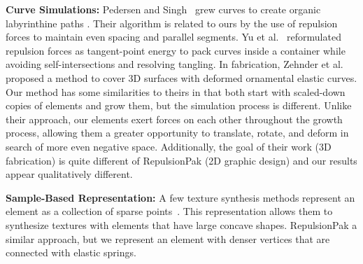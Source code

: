 \newtext
{
\textbf{Curve Simulations:}
Pedersen and Singh~\cite{Pedersen2006} grew curves to create organic
labyrinthine paths . 
Their algorithm is related to ours by the use
of repulsion forces to maintain even spacing and parallel segments.
Yu et al.~\cite{Yu2020} reformulated repulsion forces as tangent-point energy
to pack curves inside a container while avoiding self-intersections and resolving tangling.
In fabrication, Zehnder et al.~\cite{Zehnder2016} proposed a method to
cover 3D surfaces with deformed ornamental elastic curves.
Our method has some similarities to theirs in that both start with 
scaled-down copies of elements and grow them, but the simulation process is different.  
Unlike their approach, our elements exert
forces on each other throughout the growth process, allowing them a greater
opportunity to translate, rotate, and deform in search of more even negative space.  
Additionally, the goal of their work (3D fabrication) is quite 
different  of RepulsionPak (2D graphic design) and our results appear qualitatively
different.
}

\newtext
{
\textbf{Sample-Based Representation:}
A few texture synthesis methods represent an element as a collection of sparse points~\cite{Ma2011, Ma2013, Hsu2020}.
This representation allows them to synthesize textures with elements
that have large concave shapes.
RepulsionPak  a similar approach, but we represent an element
with denser vertices that are connected with elastic springs.
}



